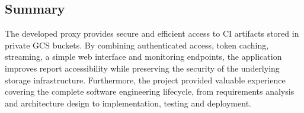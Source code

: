\subsection{Summary}

The developed proxy provides secure and efficient access to \ac{CI} artifacts stored in private \ac{GCS} buckets. By combining authenticated access, token caching, streaming, a simple web interface and monitoring endpoints, the application improves report accessibility while preserving the security of the underlying storage infrastructure. Furthermore, the project provided valuable experience covering the complete software engineering lifecycle, from requirements analysis and architecture design to implementation, testing and deployment.

\clearpage
